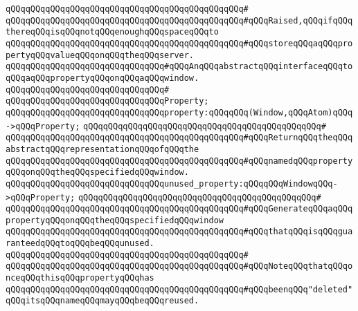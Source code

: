 \verb|qQQqqQQqqQQqqQQqqQQqqQQqqQQqqQQqqQQqqQQqqQQqqQQq#|\newline
\verb|qQQqqQQqqQQqqQQqqQQqqQQqqQQqqQQqqQQqqQQqqQQqqQQq#qQQqRaised,qQQqifqQQqthereqQQqisqQQqnotqQQqenoughqQQqspaceqQQqto|\newline
\verb|qQQqqQQqqQQqqQQqqQQqqQQqqQQqqQQqqQQqqQQqqQQqqQQq#qQQqstoreqQQqaqQQqpropertyqQQqvalueqQQqonqQQqtheqQQqserver.|\newline
\newline
\newline
\verb|qQQqqQQqqQQqqQQqqQQqqQQqqQQqqQQq#qQQqAnqQQqabstractqQQqinterfaceqQQqtoqQQqaqQQqpropertyqQQqonqQQqaqQQqwindow.|\newline
\verb|qQQqqQQqqQQqqQQqqQQqqQQqqQQqqQQq#|\newline
\verb|qQQqqQQqqQQqqQQqqQQqqQQqqQQqqQQqProperty;|\newline
\newline
\verb|qQQqqQQqqQQqqQQqqQQqqQQqqQQqqQQqproperty:qQQqqQQq(Window,qQQqAtom)qQQq->qQQqProperty;|\newline
\verb|qQQqqQQqqQQqqQQqqQQqqQQqqQQqqQQqqQQqqQQqqQQqqQQq#|\newline
\verb|qQQqqQQqqQQqqQQqqQQqqQQqqQQqqQQqqQQqqQQqqQQqqQQq#qQQqReturnqQQqtheqQQqabstractqQQqrepresentationqQQqofqQQqthe|\newline
\verb|qQQqqQQqqQQqqQQqqQQqqQQqqQQqqQQqqQQqqQQqqQQqqQQq#qQQqnamedqQQqpropertyqQQqonqQQqtheqQQqspecifiedqQQqwindow.|\newline
\newline
\newline
\verb|qQQqqQQqqQQqqQQqqQQqqQQqqQQqqQQqunused_property:qQQqqQQqWindowqQQq->qQQqProperty;|\newline
\verb|qQQqqQQqqQQqqQQqqQQqqQQqqQQqqQQqqQQqqQQqqQQqqQQq#|\newline
\verb|qQQqqQQqqQQqqQQqqQQqqQQqqQQqqQQqqQQqqQQqqQQqqQQq#qQQqGenerateqQQqaqQQqpropertyqQQqonqQQqtheqQQqspecifiedqQQqwindow|\newline
\verb|qQQqqQQqqQQqqQQqqQQqqQQqqQQqqQQqqQQqqQQqqQQqqQQq#qQQqthatqQQqisqQQqguaranteedqQQqtoqQQqbeqQQqunused.|\newline
\verb|qQQqqQQqqQQqqQQqqQQqqQQqqQQqqQQqqQQqqQQqqQQqqQQq#|\newline
\verb|qQQqqQQqqQQqqQQqqQQqqQQqqQQqqQQqqQQqqQQqqQQqqQQq#qQQqNoteqQQqthatqQQqonceqQQqthisqQQqpropertyqQQqhas|\newline
\verb|qQQqqQQqqQQqqQQqqQQqqQQqqQQqqQQqqQQqqQQqqQQqqQQq#qQQqbeenqQQq"deleted"qQQqitsqQQqnameqQQqmayqQQqbeqQQqreused.|\newline
